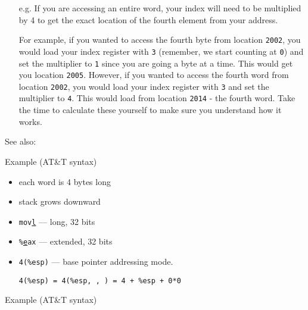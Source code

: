 \begin{itemize}
\item[e.g.] If you are accessing an entire word, your index will need to be multiplied by
  4 to get the exact location of the fourth element from your address.

  For example, if you wanted to access the fourth byte from location \texttt{2002}, you
  would load your index register with \texttt{3} (remember, we start counting at
  \texttt{0}) and set the multiplier to \texttt{1} since you are going a byte at a
  time. This would get you location \texttt{2005}. However, if you wanted to access the
  fourth word from location \texttt{2002}, you would load your index register with
  \texttt{3} and set the multiplier to \texttt{4}. This would load from location
  \texttt{2014} - the fourth word. Take the time to calculate these yourself to make sure
  you understand how it works.
\end{itemize}

See also: 

\begin{frame}
  \begin{block}{Example \scriptsize{(AT\&T syntax)}}
    \begin{center}
    \end{center}
  \end{block}
  \begin{itemize}
  \item each word is 4 bytes long
  \item stack grows downward
  \item \texttt{mov\uline{l}} --- long, 32 bits
  \item \texttt{\%\uline{e}ax} --- extended, 32 bits
  \end{itemize}
\end{frame}

\begin{itemize}
\item \texttt{4(\%esp)} --- base pointer addressing mode.
  \begin{center}
    \texttt{4(\%esp) = 4(\%esp, , ) = 4 + \%esp + 0*0}
  \end{center}
\end{itemize}

\begin{frame}
  \begin{block}{Example \scriptsize{(AT\&T syntax)}}
    \mode<beamer>{ \texttt{[image: asm]} }
  \end{block}
\end{frame}

